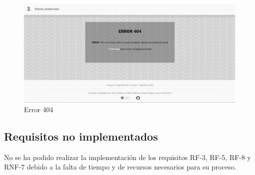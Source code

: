 \begin{figure}[H]
	\centering
	\includegraphics[width=1\textwidth]{images/error404.png}
	\caption{Error 404}
	\label{fig:UMLModel}
\end{figure}


\subsection{Requisitos no implementados}

No se ha podido realizar la implementación de los requisitos RF-3, RF-5, RF-8 y RNF-7 debido a la falta de tiempo y de recursos necesarios para su proceso. 

